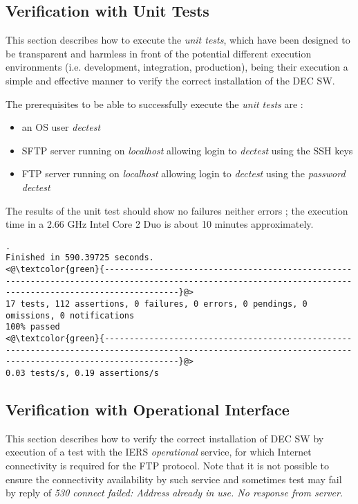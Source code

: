 \documentclass[dec_sum_main.tex]{subfiles}
\begin{document}
\subsection{Verification with Unit Tests}
This section describes how to execute the \textit{unit tests}, which have been designed to be transparent and harmless in front of the potential different execution environments (i.e. development, integration, production), being their execution a simple and effective manner to verify the correct installation of the DEC SW. \newline
\par
The prerequisites to be able to successfully execute the \textit{unit tests} are :
\begin{itemize}
	\item an OS user \textit{dectest}
	\item SFTP server running on \textit{localhost} allowing login to \textit{dectest} using the SSH keys
	\item FTP server running on \textit{localhost} allowing login to \textit{dectest} using the \textit{password} \textit{dectest} \newline
\end{itemize} 
\par
{} \newline

\noindent
The results of the unit test should show no failures neither errors ; the execution time in a 2.66 GHz Intel Core 2 Duo is about 10 minutes approximately.
\begin{lstlisting}
.
Finished in 590.39725 seconds.
<@\textcolor{green}{-----------------------------------------------------------------------------------------------------------------------------------------------------------}@>
17 tests, 112 assertions, 0 failures, 0 errors, 0 pendings, 0 omissions, 0 notifications
100% passed
<@\textcolor{green}{-----------------------------------------------------------------------------------------------------------------------------------------------------------}@>
0.03 tests/s, 0.19 assertions/s
\end{lstlisting}

\subsection{Verification with Operational Interface}
This section describes how to verify the correct installation of DEC SW by execution of a test with the IERS \textit{operational} service, for which Internet connectivity is required for the FTP protocol. Note that it is not possible to ensure the connectivity availability by such service and sometimes test may fail by reply of \textit{530 connect failed: Address already in use. No response from server.} \newline
\end{document}
